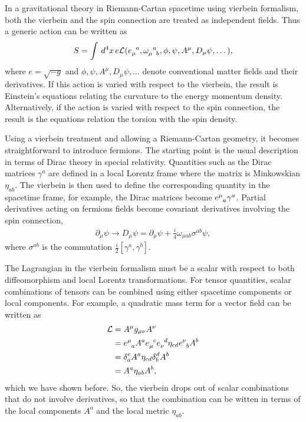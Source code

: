 \documentclass{book}
\numberwithin{equation}{section}
\theoremstyle{definition}
\newcommand{\p}{\partial}
\newcommand{\lag}{\mathcal{L}}
\newcommand{\f}[2]{\frac{#1}{#2}}
\begin{document}
In a gravitational theory in Riemann-Cartan spacetime using vierbein formalism, both the vierbein and the spin connection are treated as independent fields. Thus a generic action can be written as
\begin{align}
S = \int\,d^4x\, e \lag(\tensor{e}{_\mu^a}, \tensor{\omega}{_\mu^a_b}, \phi, \psi, A^\mu, D_{\mu}\psi,\dots),
\end{align}
where $e = \sqrt{-g}$  and $\phi, \psi, A^\mu, D_{\mu}\psi,\dots$ denote conventional matter fields and their derivatives. If this action is varied with respect to the vierbein, the result is Einstein's equations relating the curvature to the energy momentum density. Alternatively, if the action is varied with respect to the spin connection, the result is the equations relation the torsion with the spin density. 

Using a vierbein treatment and allowing a Riemann-Cartan geometry, it becomes straightforward to introduce fermions. The starting point is the usual description in terms of Dirac theory in special relativity. Quantities such as the Dirac matrices $\gamma^a$ are defined in a local Lorentz frame where the matrix is Minkowskian $\eta_{ab}$. The vierbein is then used to define the corresponding quantity in the spacetime frame, for example, the Dirac matrices become $\tensor{e}{^\mu_a}\gamma^a$. Partial derivatives acting on fermions fields become covariant derivatives involving the spin connection,
\begin{align}
\p_\mu \psi \to D_\mu\psi = \p_\mu\psi + \f{i}{4}\omega_{\mu ab}\sigma^{ab}\psi,
\end{align} 
where $\sigma^{ab}$ is the commutation $\f{i}{2}[\gamma^a, \gamma^b]$. 

The Lagrangian in the vierbein formalism must be a scalar with respect to both diffeomorphism and local Lorentz transformations. For tensor quantities, scalar combinations of tensors can be combined using either spacetime components or local components. For example, a quadratic mass term for a vector field can be written as
\begin{align}
\lag &= A^\mu g_{\mu\nu}A^\nu\\
&= \tensor{e}{^\mu_a}A^a \tensor{e}{_\mu^c}\tensor{e}{_\nu^d}\eta_{cd}\tensor{e}{^\nu_b}A^b\\
&= \delta^c_a A^a \eta_{cd}\delta^d_b A^b\\
&= A^a \eta_{ab}A^b,
\end{align}
which we have shown before. So, the vierbein drops out of scalar combinations that do not involve derivatives, so that the combination can be witten in terms of the local components $A^a$ and the local metric $\eta_{ab}$. 
\end{document}
